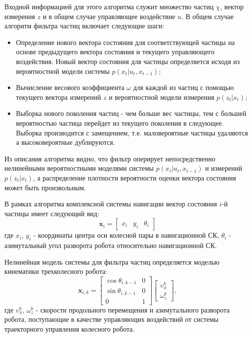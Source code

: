 \documentclass[14pt]{article}
\begin{document}
Входной информацией для этого алгоритма служит множество частиц $\chi$, вектор измерения $z$ и в общем случае управляющее воздействие $u$. 
В общем случае алгоритм фильтра частиц включает следующие шаги: 
\begin{itemize}
	\item Определение нового вектора состояния для соответствующей частицы на основе предыдущего вектора состояния и текущего управляющего воздействия. Новый вектор состояния для частицы определяется исходя из вероятностной модели системы $ p(x_t|u_t,x_{t-1})$;
	\item Вычисление весового коэффициента $\omega$ для каждой из частиц с помощью текущего вектора измерений $z$ и вероятностной модели измерения $p(z_t|x_t)$;
	\item Выборка нового поколения частиц - чем больше вес частицы, тем с большей вероятностью частица перейдет из текущего поколения в следующее. Выборка производится с замещением, т.е. маловероятные частицы удаляются а высоковероятные дублируются.
\end{itemize}

Из описания алгоритма видно, что фильтр оперирует непосредственно нелинейными вероятностными моделями системы $p(x_t|u_t,x_{t-1})$  и измерений $p(z_t|x_t)$, а распределение плотности вероятности оценки вектора состояния может быть произвольным.

В рамках алгоритма комплексной системы навигации вектор состояния $i$-й частицы имеет следующий вид:
\begin{equation}
 \mathbf x_i = \begin{bmatrix} x_i & y_i & \theta_i  \end{bmatrix}
\end{equation}
где $x_i$, $y_i$ - координаты центра оси колесной пары в навигационной СК, $\theta_i$ - азимутальный угол разворота робота относительно навигационной СК.

Нелинейная модель системы для фильтра частиц определяется моделью кинематики трехколесного робота:
\begin{equation}
 \mathbf x_{i, k} = \begin{bmatrix}  \cos{\theta_{i, k-1}} & 0 \\  \sin{\theta_{i, k-1}} & 0 \\ 0 & 1 \end{bmatrix} \begin{bmatrix} \upsilon^b_x \\ \omega^b_z \end{bmatrix},
\end{equation}
где $ \upsilon^b_x$, $\omega^b_z$ - скорости продольного перемещения и азимутального разворота робота, поступающие в качестве управляющих воздействий от системы траекторного управления колесного робота.
\end{document}
